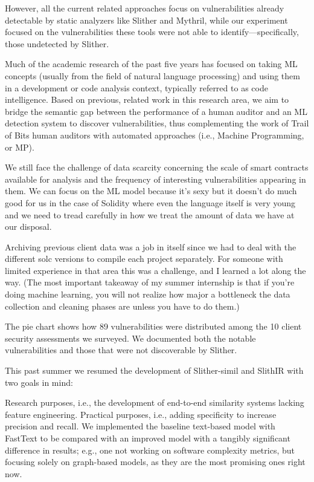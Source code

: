 However, all the current related approaches focus on vulnerabilities already detectable by static analyzers like Slither and Mythril, while our experiment focused on the vulnerabilities these tools were not able to identify—specifically, those undetected by Slither.

Much of the academic research of the past five years has focused on taking ML concepts (usually from the field of natural language processing) and using them in a development or code analysis context, typically referred to as code intelligence.
Based on previous, related work in this research area, we aim to bridge the semantic gap between the performance of a human auditor and an ML detection system to discover vulnerabilities, thus complementing the work of Trail of Bits human auditors with automated approaches (i.e., Machine Programming, or MP).

We still face the challenge of data scarcity concerning the scale of smart contracts available for analysis and the frequency of interesting vulnerabilities appearing in them.
We can focus on the ML model because it's sexy but it doesn't do much good for us in the case of Solidity where even the language itself is very young and we need to tread carefully in how we treat the amount of data we have at our disposal.

Archiving previous client data was a job in itself since we had to deal with the different solc versions to compile each project separately.
For someone with limited experience in that area this was a challenge, and I learned a lot along the way. (The most important takeaway of my summer internship is that if you're doing machine learning, you will not realize how major a bottleneck the data collection and cleaning phases are unless you have to do them.)

The pie chart shows how 89 vulnerabilities were distributed among the 10 client security assessments we surveyed.
We documented both the notable vulnerabilities and those that were not discoverable by Slither.

This past summer we resumed the development of Slither-simil and SlithIR with two goals in mind:

Research purposes, i.e., the development of end-to-end similarity systems lacking feature engineering.
Practical purposes, i.e., adding specificity to increase precision and recall.
We implemented the baseline text-based model with FastText to be compared with an improved model with a tangibly significant difference in results;
e.g., one not working on software complexity metrics, but focusing solely on graph-based models, as they are the most promising ones right now.


